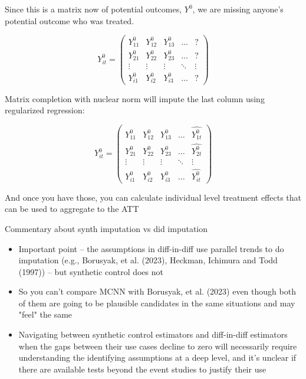 \documentclass{beamer}
\begin{document}
\begin{frame}[plain]

Since this is a matrix now of potential outcomes, $Y^0$, we are missing anyone's potential outcome who was treated. 

\begin{center}
\[ Y^0_{it}  =\begin{pmatrix}
    Y^0_{11} & Y^0_{12} & Y^0_{13} & \dots  & ? \\
    Y^0_{21} & Y^0_{22} & Y^0_{23} & \dots  & ? \\
    \vdots & \vdots & \vdots & \ddots & \vdots \\
    Y^0_{i1} & Y^0_{i2} & Y^0_{i3} & \dots  & ?
\end{pmatrix}\]
\end{center}



\end{frame}


\begin{frame}[plain]

Matrix completion with nuclear norm will impute the last column using regularized regression:

\begin{center}
\[ Y^0_{it}  =\begin{pmatrix}
    Y^0_{11} & Y^0_{12} & Y^0_{13} & \dots  & \widehat{Y^0_{1t}} \\
    Y^0_{21} & Y^0_{22} & Y^0_{23} & \dots  & \widehat{Y^0_{2t}} \\
    \vdots & \vdots & \vdots & \ddots & \vdots \\
    Y^0_{i1} & Y^0_{i2} & Y^0_{i3} & \dots  & \widehat{Y^0_{it}}
\end{pmatrix}\]
\end{center}

And once you have those, you can calculate individual level treatment effects that can be used to aggregate to the ATT

\end{frame}



\begin{frame}{Commentary about synth imputation vs did imputation}

\begin{itemize}
\item Important point -- the assumptions in diff-in-diff use parallel trends to do imputation (e.g., Borusyak, et al. (2023), Heckman, Ichimura and Todd (1997)) -- but synthetic control does not
\item So you can't compare MCNN with Borusyak, et al. (2023) even though both of them are going to be plausible candidates in the same situations and may "feel" the same
\item Navigating between synthetic control estimators and diff-in-diff estimators when the gaps between their use cases decline to zero will necessarily require understanding the identifying assumptions at a deep level, and it's unclear if there are available tests beyond the event studies to justify their use
\end{itemize}

\end{frame}
\end{document}
